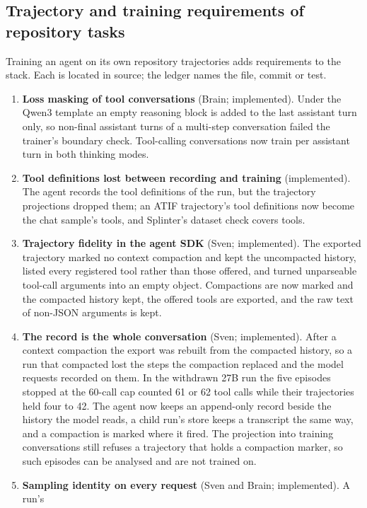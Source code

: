 \subsection{Trajectory and training requirements of repository tasks}\label{sec:audit}

Training an agent on its own repository trajectories adds requirements to the stack. Each is
located in source; the ledger names the file, commit or test.

\begin{enumerate}
\item \textbf{Loss masking of tool conversations} (Brain; implemented). Under the Qwen3 template
an empty reasoning block is added to the last assistant turn only, so non-final assistant
turns of a multi-step conversation failed the trainer's boundary check. Tool-calling
conversations now train per assistant turn in both thinking modes.
\item \textbf{Tool definitions lost between recording and training} (implemented). The agent
records the tool definitions of the run, but the trajectory projections dropped them; an
ATIF trajectory's tool definitions now become the chat sample's tools, and Splinter's
dataset check covers tools.
\item \textbf{Trajectory fidelity in the agent SDK} (Sven; implemented). The exported trajectory
marked no context compaction and kept the uncompacted history, listed every registered tool
rather than those offered, and turned unparseable tool-call arguments into an empty object.
Compactions are now marked and the compacted history kept, the offered tools are exported,
and the raw text of non-JSON arguments is kept.
\item \textbf{The record is the whole conversation} (Sven; implemented). After a context
compaction the export was rebuilt from the compacted history, so a run that compacted lost the
steps the compaction replaced and the model requests recorded on them. In the withdrawn 27B run
the five episodes stopped at the 60-call cap counted 61 or 62 tool calls while their trajectories
held four to 42. The agent now keeps an append-only record beside the history the model reads, a
child run's store keeps a transcript the same way, and a compaction is marked where it fired. The
projection into training conversations still refuses a trajectory that holds a compaction marker,
so such episodes can be analysed and are not trained on.
\item \textbf{Sampling identity on every request} (Sven and Brain; implemented). A run's

\end{enumerate}
